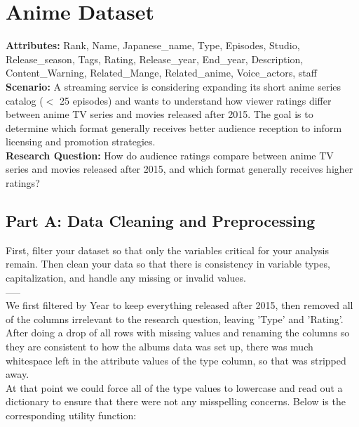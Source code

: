 \section{Anime Dataset}

{\bf Attributes:} Rank, Name, Japanese\_name, Type, Episodes, Studio, Release\_season, Tags, Rating, Release\_year, End\_year, Description, Content\_Warning, Related\_Mange, Related\_anime, Voice\_actors, staff\\

{\bf Scenario:}  A streaming service is considering expanding its short anime series catalog ($<$ 25 episodes) and wants to understand how viewer ratings differ between anime TV series and movies released after 2015. The goal is to determine which format generally receives better audience reception to inform licensing and promotion strategies.\\

{\bf Research Question:} How do audience ratings compare between anime TV series and movies released after 2015, and which format generally receives higher ratings?

\subsection{Part A: Data Cleaning and Preprocessing}
First, filter your dataset so that only the variables critical for your analysis remain. Then clean your data so that there is consistency in variable types, capitalization, and handle any missing or invalid values.\\
-----\\
We first filtered by Year to keep everything released after 2015, then removed all of the columns irrelevant to the research question, leaving 'Type' and 'Rating'. After doing a drop of all rows with missing values and renaming the columns so they are consistent to how the albums data was set up, there was much whitespace left in the attribute values of the type column, so that was stripped away. \\

At that point we could force all of the type values to lowercase and read out a dictionary to ensure that there were not any misspelling concerns. Below is the corresponding utility function:\\
 
